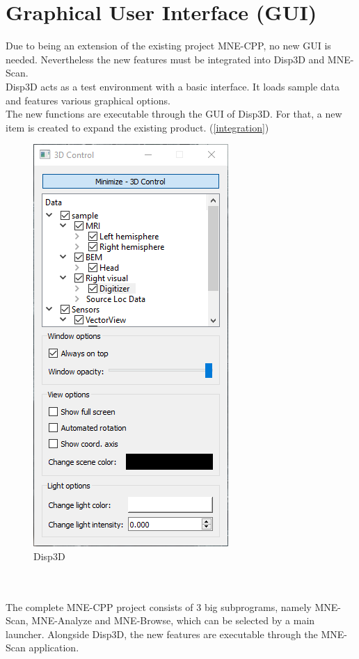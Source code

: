 \section{Graphical User Interface (GUI)}

Due to being an extension of the existing project MNE-CPP, no new GUI is needed. Nevertheless the new features must be integrated into Disp3D and MNE-Scan. \\

Disp3D acts as a test environment with a basic interface. It loads sample data and features various graphical options. \\
The new functions are executable through the GUI of Disp3D. For that, a new item is created to expand the existing product. (\ref{integration}) \\ 
	
\begin{figure}
	
	\begin{center}
		
		\includegraphics[scale=0.5]{Figures/Disp3D.PNG}
	
	\end{center}
	
	\caption{Disp3D}

\end{figure}
~\\
~\\
The complete MNE-CPP project consists of 3 big subprograms, namely MNE-Scan, MNE-Analyze and MNE-Browse, which can be selected by a main launcher. Alongside Disp3D, the new features are executable through the MNE-Scan application.

